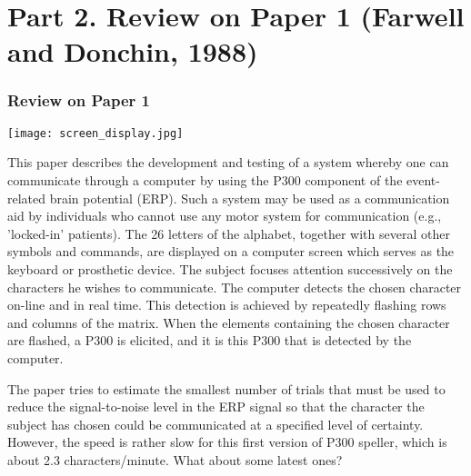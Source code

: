 \documentclass{beamer}
\begin{document}
	\section{Part 2. Review on Paper 1 (Farwell and Donchin, 1988)}
	\begin{frame}[t]
		\frametitle{Review on Paper 1}
		\begin{minipage}{0.4\linewidth}
			\texttt{[image: screen\_display.jpg]}
		\end{minipage}
		\vspace{3mm}
		\hspace{1mm}
		\begin{minipage}{0.55\linewidth}
			\scriptsize
			This paper describes the development and testing of a system whereby one can communicate through a computer by using the P300 component of the event-related brain potential (ERP). Such a system may be used as a communication aid by individuals who cannot use any motor system for communication (e.g., 'locked-in' patients). The 26 letters of the alphabet, together with several other symbols and commands, are displayed on a computer screen which serves as the keyboard or prosthetic device. The subject focuses attention successively on the characters he wishes to communicate. The computer detects the chosen character on-line and in real time. This detection is achieved by repeatedly flashing rows and columns of the matrix. When the elements containing the chosen character are flashed, a P300 is elicited, and it is this P300 that is detected by the computer. \\
		\end{minipage}
	
		\scriptsize
		The paper tries to estimate the smallest number of trials that must be used to reduce the signal-to-noise level in the ERP signal so that the character the subject has chosen could be communicated at a specified level of certainty. However, the speed is rather slow for this first version of P300 speller, which is about 2.3 characters/minute. What about some latest ones?
	\end{frame}
	
\end{document}
